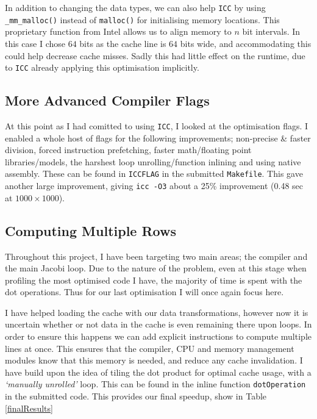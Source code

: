 \documentclass[10pt,twocolumn,a4paper]{article}
\def\tm{\texttrademark\xspace}
\begin{document}
In addition to changing the data types, we can also help \texttt{ICC} by using \texttt{\_mm\_malloc()} instead of \texttt{malloc()} for initialising memory locations. This proprietary function from Intel\tm allows us to align memory to $n$ bit intervals. In this case I chose $64$ bits as the cache line is $64$ bits wide, and accommodating this could help decrease cache misses. Sadly this had little effect on the runtime, due to \texttt{ICC} already applying this optimisation implicitly. \par

\subsection{More Advanced Compiler Flags}
At this point as I had comitted to using \texttt{ICC}, I looked at the optimisation flags. I enabled a whole host of flags for the following improvements; non-precise \& faster division, forced instruction prefetching, faster math/floating point libraries/models, the harshest loop unrolling/function inlining and using native assembly. These can be found in \texttt{ICCFLAG} in the submitted \texttt{Makefile}. This gave another large improvement, giving \texttt{icc -O3} about a 25\% improvement (0.48 sec at $1000\times1000$). \par

\subsection{Computing Multiple Rows}
Throughout this project, I have been targeting two main areas; the compiler and the main Jacobi loop. Due to the nature of the problem, even at this stage when profiling the most optimised code I have, the majority of time is spent with the dot operations. Thus for our last optimisation I will once again focus here. \par

I have helped loading the cache with our data transformations, however now it is uncertain whether or not data in the cache is even remaining there upon loops. In order to ensure this happens we can add explicit instructions to compute multiple lines at once. This ensures that the compiler, CPU and memory management modules know that this memory is needed, and reduce any cache invalidation. I have build upon the idea of tiling the dot product for optimal cache usage, with a \textit{`manually unrolled'} loop. This can be found in the inline function \texttt{dotOperation} in the submitted code. This provides our final speedup, show in Table \ref{finalResults} \par
\end{document}
